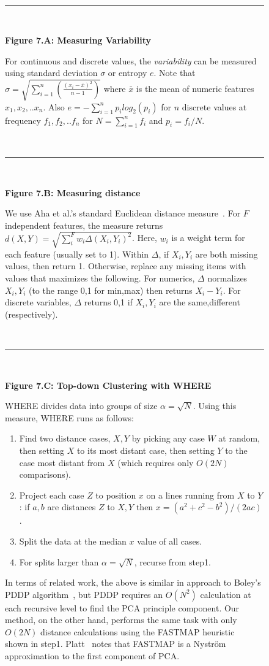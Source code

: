 
	\begin{figure} 
	\begin{shaded}
  ~\hrule~
  
 {\bf Figure 7.A: Measuring Variability} 
	
	For  continuous and discrete values,
the {\em variability} can be measured using standard deviation $\sigma$ or entropy $e$.
Note that \mbox{$\sigma = \sqrt{\sum^n_{i=1} \left( \frac{(x_i - \bar{x})^2}{n-1}\right)}$}
where $\bar{x}$ is the mean of  numeric features $x_1,x_2,..x_n$.
Also \mbox{$e = - \sum^n_{i=1} p_i \mathit{log}_2(p_i)$} 
for  $n$ discrete values  at frequency
$f_1,f_2,.. f_n$ for \mbox{$N = \sum^n_{i=1} f_i$} and $p_i = f_i/N$.

  ~\hrule~
	
	{\bf Figure 7.B: Measuring distance}
	
	We use
		 Aha et al.'s standard Euclidean distance measure~\cite{aha91}.  For $F$ independent features, the measure returns   $d(X,Y)=\sqrt{\sum_i^F  w_i\Delta(X_i,Y_i)^2}$. Here, $w_i$ is a weight term for each feature
		 (usually set to 1).
			Within $\Delta$, if   $X_i,Y_i$ are both missing  values, then  return 1.
			Otherwise, replace any  missing items with values that maximizes the following.
			For numerics, $\Delta$ normalizes $X_i,Y_i$ (to the range 0,1 for min,max) then
			returns 
			$X_i - Y_i$. For discrete variables, $\Delta$ returns 0,1 if $X_i,Y_i$ are the
			same,different (respectively).  

 ~\hrule~
 
	{\bf Figure 7.C: Top-down Clustering with WHERE}
	
				WHERE  divides data into  groups of size $\alpha=\sqrt{N}$. 
		Using this measure, WHERE runs as follows:
		\begin{enumerate}[leftmargin=3mm]
			\item Find   two   distance cases,  $X,Y$
			by picking any case $W$ at random, then setting $X$ to its most
			distant case, then setting $Y$ to the case most distant from
			$X$
			(which requires only $O(2N)$ comparisons).
			\item Project each case $Z$
			to position $x$ on a    lines running from $X$ to $Y$: if $a,b$  are distances  $Z$ to $X,Y$  then  $x = (a^2+c^2 - b^2)/(2ac)$.
			\item Split the data at the median $x$ value of all cases.
			\item For   splits larger than  $\alpha=\sqrt{N}$, recurse   from step1.
		\end{enumerate}
 In terms of related work,
	  the above is similar in approach to Boley's PDDP algorithm~\cite{boley98}, but PDDP requires an $O(N^2)$ calculation
	  at each recursive level to find the PCA principle component. Our method, on the other hand,
	  performs the same task with only $O(2N)$ distance calculations 	using the 
	  FASTMAP heuristic~\cite{Faloutsos1995} shown in step1. Platt~\cite{platt05} notes that FASTMAP is a  Nystr\"om approximation to the first component of PCA.  
	  

\end{shaded}
\end{figure}
